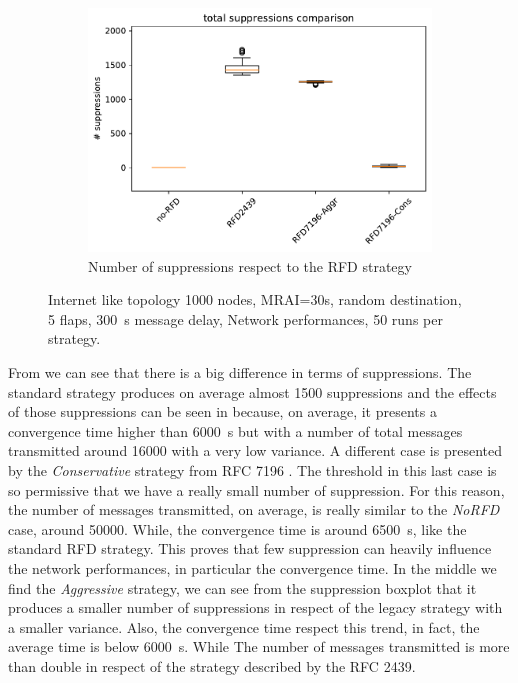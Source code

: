 \begin{figure}[h]
\begin{subfigure}[b]{0.325\textwidth}
     \end{subfigure}
     \hfill
     \begin{subfigure}[b]{0.325\textwidth}
         \centering
         \includegraphics[width=\textwidth]{images/RFD/miceVSelephants/mice/cisco_1000MRAI30_rfd_comparison_suppressions_boxplot.pdf}
         \caption{Number of suppressions respect to the RFD strategy}
         \label{fig:1000_RFD_MRAI30_mice_suppressions_bis}
     \end{subfigure}
		\caption{Internet like topology 1000 nodes, MRAI=30s, random destination, 
		5 flaps, \SI{300}{\second} message delay, Network performances,
		\num{50} runs per strategy.}
        \label{fig:1000_RFD_MRAI30_mice_bis}
\end{figure}

From  we can see that there is a
big difference in terms of suppressions.
The standard strategy produces on average almost \num{1500} suppressions and the effects
of those suppressions can be seen in 
because, on average, it presents a convergence time higher than \SI{6000}{\second} 
but with a number of total messages transmitted around \num{16000} with a very 
low variance.
A different case is presented by the \textit{Conservative} strategy from \ac{RFC}
7196 \cite{rfc7196}.
The threshold in this last case is so permissive that we have a really small 
number of suppression.
For this reason, the number of messages transmitted, on average, is really similar to 
the \textit{NoRFD} case, around \num{50000}.
While, the convergence time is around \SI{6500}{\second}, like the standard \ac{RFD}
strategy.
This proves that few suppression can heavily influence the network performances,
in particular the convergence time.
In the middle we find the \textit{Aggressive} strategy, we can see from the
suppression boxplot that it produces a smaller number of suppressions in respect
of the legacy strategy with a smaller variance.
Also, the convergence time respect this trend, in fact, the average time is 
below \SI{6000}{\second}.
While The number of messages transmitted is more than double in respect
of the strategy described by the \ac{RFC} \num{2439}.

